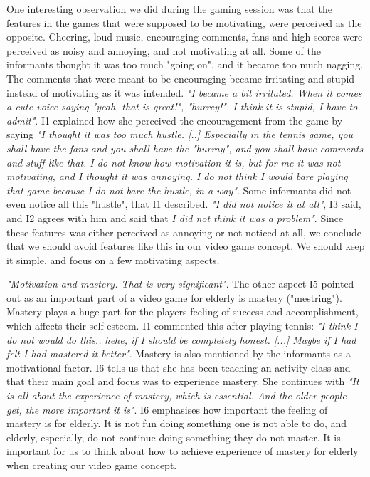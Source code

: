 One interesting observation we did during the gaming session was that the features in the games that were supposed to be motivating, were perceived as the opposite. Cheering, loud music, encouraging comments, fans and high scores were perceived as noisy and annoying, and not motivating at all. Some of the informants thought it was too much "going on", and it became too much nagging. The comments that were meant to be encouraging became irritating and stupid instead of motivating as it was intended. \emph{"I became a bit irritated. When it comes a cute voice saying "yeah, that is great!", "hurrey!". I think it is stupid, I have to admit"}.  I1 explained how she perceived the encouragement from the game by saying \emph{"I thought it was too much hustle. [..] Especially in the tennis game, you shall have the fans and you shall have the "hurray", and you shall have comments and stuff like that. I do not know how motivation it is, but for me it was not motivating, and I thought it was annoying. I do not think I would bare playing that game because I do not bare the hustle, in a way"}. Some informants did not even notice all this "hustle", that I1 described. \emph{"I did not notice it at all"}, I3 said, and I2 agrees with him and said that \emph{I did not think it was a problem"}. Since these features was either perceived as annoying or not noticed at all, we conclude that we should avoid features like this in our video game concept. We should keep it simple, and focus on a few motivating aspects. 

\emph{"Motivation and mastery. That is very significant"}. The other aspect I5 pointed out as an important part of a video game for elderly is mastery ("mestring"). Mastery plays a huge part for the players feeling of success and accomplishment, which affects their self esteem. I1 commented this after playing tennis: \emph{"I think I do not would do this.. hehe, if I should be completely honest. [...] Maybe if I had felt I had mastered it better"}. Mastery is also mentioned by the informants as a motivational factor. I6 tells us that she has been teaching an activity class and that their main goal and focus was to experience mastery. She continues with \emph{"It is all about the experience of mastery, which is essential. And the older people get, the more important it is"}. I6 emphasises how important the feeling of mastery is for elderly. It is not fun doing something one is not able to do, and elderly, especially, do not continue doing something they do not master. It is important for us to think about how to achieve experience of mastery for elderly when creating our video game concept. 

